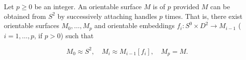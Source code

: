 Let $p \geqslant 0$ be an integer. An orientable surface $M$ is of  $p$ provided $M$ can be obtained from $S^2$ by successively attaching handles $p$ times. That is, there exist orientable surfaces $M_0, \ldots, M_p$ and orientable embeddings $f_i: S^0 \times D^2 \to M_{i-1}$ ($i = 1, \ldots, p$, if $p > 0$) such that

$$M_0 \approx S^2, \quad M_i \approx M_{i-1}[f_i], \quad M_p = M.$$
